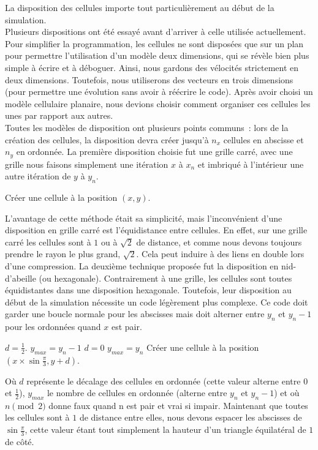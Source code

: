 \documentclass[a4paper,11pt]{article}
\begin{document}
La disposition des cellules importe tout particulièrement au début de la simulation. \\
Plusieurs dispositions ont été essayé avant d'arriver à celle utilisée actuellement.
Pour simplifier la programmation, les cellules ne sont disposées que sur un plan pour permettre l'utilisation d'un modèle deux dimensions, qui se révèle bien plus simple à écrire et à déboguer. Ainsi, nous gardons des vélocités strictement en deux dimensions. Toutefois, nous utiliserons des vecteurs en trois dimensions (pour permettre une évolution sans avoir à réécrire le code).
Après avoir choisi un modèle cellulaire planaire, nous devions choisir comment organiser ces cellules les unes par rapport aux autres. \\
Toutes les modèles de disposition ont plusieurs points communs~: lors de la création des cellules, la disposition devra créer jusqu'à $n_x$ cellules en abscisse et $n_y$ en ordonnée.
La première disposition choisie fut une grille carré, avec une grille nous faisons simplement une itération $x$ à $x_n$ et imbriqué à l'intérieur une autre itération de $y$ à $y_n$.

\medbreak
\begin{algorithmic}[1]
	\STATE Créer une cellule à la position $(x, y)$.
      \ENDFOR
    \ENDFOR
\end{algorithmic}
\medbreak

L'avantage de cette méthode était sa simplicité, mais l'inconvénient d'une disposition en grille carré est l'équidistance entre cellules.
En effet, sur une grille carré les cellules sont à $1$ ou à $\sqrt{2}$ de distance, et comme nous devons toujours prendre le rayon le plus grand, $\sqrt{2}$. Cela peut induire à des liens en double lors d'une compression.
La deuxième technique proposée fut la disposition en nid-d'abeille (ou hexagonale).
Contrairement à une grille, les cellules sont toutes équidistantes dans une disposition hexagonale. Toutefois, leur disposition au début de la simulation nécessite un code légèrement plus complexe.
Ce code doit garder une boucle normale pour les abscisses mais doit alterner entre $y_n$ et $y_n - 1$ pour les ordonnées quand $x$ est pair.

\medbreak
\begin{algorithmic}[1]
	\STATE $d = \frac{1}{2}$.
	\STATE $y_{max} = y_n - 1$
      \ELSE
	\STATE $d = 0$
	\STATE $y_{max} = y_n$
      \ENDIF
	\STATE Créer une cellule à la position $\displaystyle{(x \times \sin \frac{\pi}{3}, y + d)}$.
      \ENDFOR
   \ENDFOR
\end{algorithmic}
\medbreak
Où $d$ représente le décalage des cellules en ordonnée (cette valeur alterne entre $0$ et $\frac{1}{2}$), $y_{max}$ le nombre de cellules en ordonnée (alterne entre $y_n$ et $y_n - 1$) et où $n \pmod 2$ donne faux quand n est pair et vrai si impair.
Maintenant que toutes les cellules sont à $1$ de distance entre elles, nous devons espacer les abscisses de $\displaystyle{\sin \frac{\pi}{3}}$, cette valeur étant tout simplement la hauteur d'un triangle équilatéral de $1$ de côté.
\end{document}
